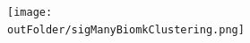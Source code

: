 \documentclass[8pt,xcolor=table]{beamer}
\begin{document}
\begin{frame}
\begin{columns}[T]
\begin{column}{.25\textwidth}
    
    \begin{figure}
    \centering
    \texttt{[image: \\outFolder/sigManyBiomkClustering.png]}
    \end{figure}

    \end{column}
  \end{columns}
  
% 
%   


\end{frame}

\end{document}
